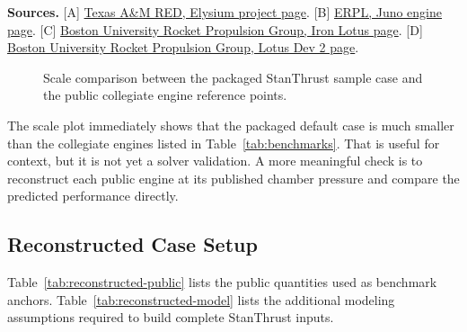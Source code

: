 \documentclass[11pt]{article}
\begin{document}
\noindent\textbf{Sources.}
[A] \href{https://www.tamured.space/projects/elysium}{Texas A\&M RED, Elysium project page}.
[B] \href{https://erpl.space/juno/}{ERPL, Juno engine page}.
[C] \href{https://burpg.org/iron-lotus}{Boston University Rocket Propulsion Group, Iron Lotus page}.
[D] \href{https://burpg.org/lotus-dev-2}{Boston University Rocket Propulsion Group, Lotus Dev 2 page}.

\begin{figure}[H]
\centering
{}
\caption{Scale comparison between the packaged StanThrust sample case and the public collegiate engine reference points.}
\end{figure}

The scale plot immediately shows that the packaged default case is much smaller than the collegiate engines listed in Table~\ref{tab:benchmarks}. That is useful for context, but it is not yet a solver validation. A more meaningful check is to reconstruct each public engine at its published chamber pressure and compare the predicted performance directly.

\subsection*{Reconstructed Case Setup}
Table~\ref{tab:reconstructed-public} lists the public quantities used as benchmark anchors. Table~\ref{tab:reconstructed-model} lists the additional modeling assumptions required to build complete StanThrust inputs.
\end{document}
